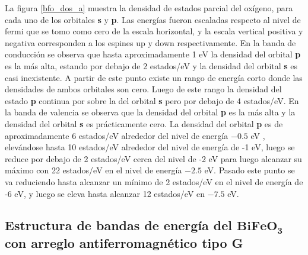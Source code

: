 
\noindent La figura \ref{bfo_dos_a}  muestra la densidad de 
estados parcial del 
ox\'igeno, 
para cada uno de los orbitales \textbf{s} y \textbf{p}. Las energ\'ias 
fueron escaladas respecto al 
nivel de fermi que se tomo como cero de la escala horizontal, y la escala 
vertical positiva y negativa corresponden a los espines up y down 
respectivamente. En la banda de conducci\'on se observa que hasta 
aproximadamente 1 eV la densidad del orbital \textbf{p} es la m\'as alta, 
estando por debajo de 2 estados/eV y la densidad del orbital \textbf{s} es casi 
inexistente. A partir de este punto existe un rango de energ\'ia corto donde 
las densidades de ambos orbitales son cero. Luego de este rango la densidad del 
estado \textbf{p} continua por sobre la del orbital \textbf{s} pero por debajo 
de 4 estados/eV. En la banda de valencia se observa que la densidad del orbital 
\textbf{p} es la m\'as alta y la densidad del orbital \textbf{s} es 
pr\'acticamente cero. La densidad del orbital \textbf{p} es de aproximadamente 
6 estados/eV alrededor del nivel de energ\'ia $-0.5$ eV , elev\'andose hasta 10 
estados/eV alrededor del nivel de energ\'ia de -1 eV, luego se reduce por 
debajo de 2 estados/eV cerca del nivel de -2 eV para luego alcanzar su m\'aximo 
con 22 estados/eV en el nivel de energ\'ia $-2.5$ eV. Pasado este punto se va 
reduciendo hasta alcanzar un m\'inimo de 2 estados/eV en el nivel de energ\'ia 
de -6 eV, y luego se eleva hasta alcanzar 12 estados/eV en $-7.5$ eV.



\subsection{Estructura de bandas de energ\'ia del $\mathbf{BiFeO_{3}}$ con      
arreglo antiferromagn\'etico tipo G}


